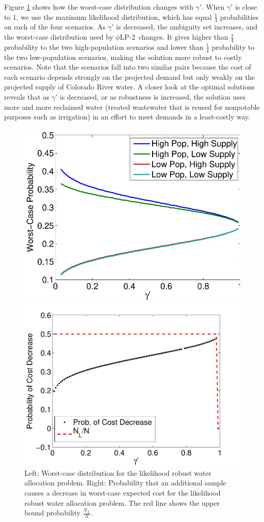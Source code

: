 \documentclass[opre,nonblindrev]{informs3} %
\newcommand{\plp}{$\phi$LP-2}
\begin{document}
Figure \ref{fig:water_worst_case} shows how the worst-case distribution changes with $\gamma'$.
When $\gamma'$ is close to $1$, we use the maximum likelihood distribution, which has equal $\tfrac{1}{4}$ probabilities on each of the four scenarios.
As $\gamma'$ is decreased, the ambiguity set increases, and the worst-case distribution used by \plp\ changes.
It gives higher than $\tfrac{1}{4}$ probability to the two high-population scenarios and lower than $\tfrac{1}{4}$ probability to the two low-population scenarios, making the solution more robust to costly scenarios.
Note that the scenarios fall into two similar pairs because the cost of each scenario depends strongly on the projected demand but only weakly on the projected supply of Colorado River water.
A closer look at the optimal solutions reveals that as $\gamma'$ is decreased, or as robustness is increased, the solution uses more and more reclaimed water (treated wastewater that is reused for nonpotable purposes such as irrigation) in an effort to meet demands in a least-costly way.

\begin{figure}
	\FIGURE
	{%
		\includegraphics*[width=.45\textwidth]{images/worst_case_probability}%
		\includegraphics*[width=.45\textwidth]{images/water_prob_decrease}%
	}
	{
		Left: Worst-case distribution for the likelihood robust water allocation problem.
		Right: Probability that an additional sample causes a decrease in worst-case expected cost for the likelihood robust water allocation problem.
		The red line shows the upper bound probability $\tfrac{N_L}{N}$.
		\label{fig:water_worst_case}
	}
	{}
\end{figure}
\end{document}
